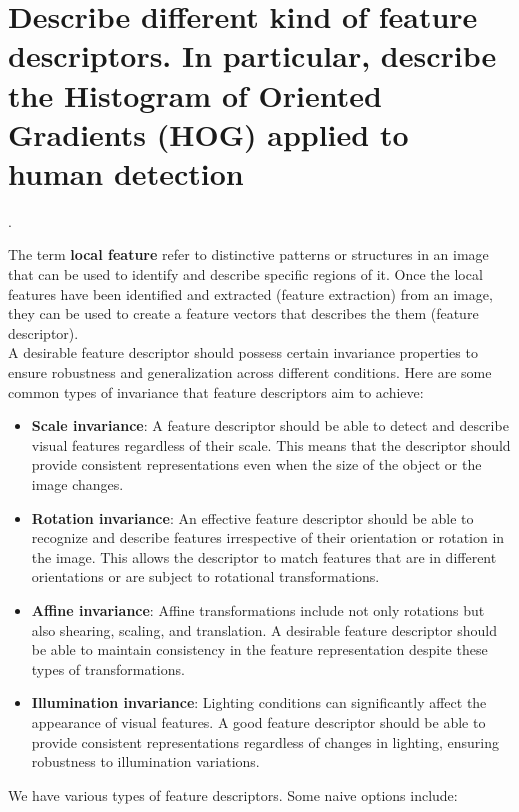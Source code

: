 \documentclass{article}
\begin{document}
\newpage

\section{Describe different kind of feature descriptors. In particular, describe the Histogram of Oriented Gradients (HOG) applied to human detection}.

The term \textbf{local feature} refer to distinctive patterns or structures in an image that can be used to identify and describe specific regions of it. Once the local features have been identified and extracted (feature extraction) from an image, they can be used to create a feature vectors that describes the them (feature descriptor). \\

A desirable feature descriptor should possess certain invariance properties to ensure robustness and generalization across different conditions. Here are some common types of invariance that feature descriptors aim to achieve:

\begin{itemize}
    \item \textbf{Scale invariance}: A feature descriptor should be able to detect and describe visual features regardless of their scale. This means that the descriptor should provide consistent representations even when the size of the object or the image changes.
    \item \textbf{Rotation invariance}: An effective feature descriptor should be able to recognize and describe features irrespective of their orientation or rotation in the image. This allows the descriptor to match features that are in different orientations or are subject to rotational transformations.
    \item \textbf{Affine invariance}: Affine transformations include not only rotations but also shearing, scaling, and translation. A desirable feature descriptor should be able to maintain consistency in the feature representation despite these types of transformations.    
    \item \textbf{Illumination invariance}: Lighting conditions can significantly affect the appearance of visual features. A good feature descriptor should be able to provide consistent representations regardless of changes in lighting, ensuring robustness to illumination variations.
\end{itemize}

\newpage

We have various types of feature descriptors. Some naive options include:
\end{document}
